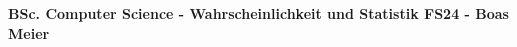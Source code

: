 \documentclass{article}
\begin{document}
\scriptsize

\begin{center}
     \Large{\textbf{BSc. Computer Science - Wahrscheinlichkeit und Statistik FS24 - Boas Meier}}
\end{center}

\begin{multicols}{4}
\setlength{\premulticols}{0.5pt}
\setlength{\postmulticols}{0.5pt}
\setlength{\multicolsep}{0.5pt}
\setlength{\columnsep}{0.2pt}
\setlength{\columnseprule}{0.4pt}
\setlength{\intextsep}{0pt}

\setlength{\abovedisplayskip}{0pt}
\setlength{\abovedisplayshortskip}{0pt}
\setlength{\belowdisplayskip}{0pt}
\setlength{\belowdisplayshortskip}{0pt}

\begin{flushleft}











\end{flushleft}
\end{multicols}
\end{document}
